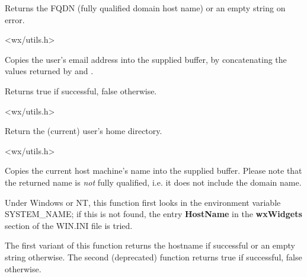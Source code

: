 
Returns the FQDN (fully qualified domain host name) or an empty string on
error.




<wx/utils.h>


\label{wxgetemailaddress}


Copies the user's email address into the supplied buffer, by
concatenating the values returned by \rtfsp
and .

Returns true if successful, false otherwise.


<wx/utils.h>


\label{wxgethomedir}


Return the (current) user's home directory.




<wx/utils.h>


\label{wxgethostname}



Copies the current host machine's name into the supplied buffer. Please note
that the returned name is {\it not} fully qualified, i.e. it does not include
the domain name.

Under Windows or NT, this function first looks in the environment
variable SYSTEM\_NAME; if this is not found, the entry {\bf HostName}\rtfsp
in the {\bf wxWidgets} section of the WIN.INI file is tried.

The first variant of this function returns the hostname if successful or an
empty string otherwise. The second (deprecated) function returns true
if successful, false otherwise.

